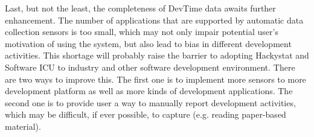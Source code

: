 Last, but not the least, the completeness of DevTime data awaits further enhancement. The number of applications that are supported by automatic data collection sensors is too small, which may not only impair potential user's motivation of using the system, but also lead to bias in different development activities. This shortage will probably raise the barrier to adopting Hackystat and Software ICU to industry and other software development environment. There are two ways to improve this. The first one is to implement more sensors to more development platform as well as more kinds of development applications. The second one is to provide user a way to manually report development activities, which may be difficult, if ever possible, to capture (e.g. reading paper-based material).


